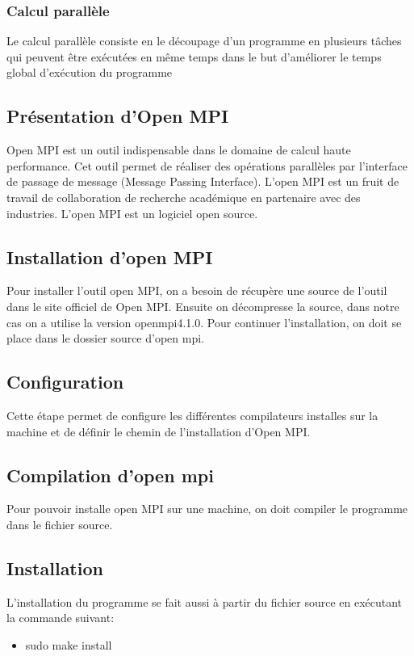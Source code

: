 \documentclass[11pt]{article}
\begin{document}
\subsubsection{Calcul parallèle}
\label{sec:org32fbeed}
Le calcul parallèle consiste en le découpage d’un programme en plusieurs tâches qui peuvent être exécutées en même temps dans le but d’améliorer le temps global d’exécution du programme
\subsection{Présentation d'Open MPI}
\label{sec:org5c4e16c}
Open MPI est un outil indispensable dans le domaine de calcul haute performance.
Cet outil permet de réaliser des opérations parallèles par l'interface de passage de message (Message Passing Interface).
L'open MPI est un fruit de travail de collaboration de recherche académique en partenaire avec des industries. L'open MPI est un logiciel open source.
\subsection{Installation d'open MPI}
\label{sec:orgd843bc6}
Pour installer l'outil open MPI, on a besoin de récupère une source de l'outil dans le site officiel de Open MPI. Ensuite on décompresse la source, dans notre cas on a utilise la version openmpi4.1.0.
Pour continuer l'installation, on doit se place dans le dossier source d'open mpi.
\subsection{Configuration}
\label{sec:orgad5bd49}
Cette étape permet de configure les différentes compilateurs installes sur la machine et de définir le chemin de l'installation d'Open MPI.
\subsection{Compilation d'open mpi}
\label{sec:org13bab62}
Pour pouvoir installe open MPI sur une machine, on doit compiler le programme dans le fichier source.
\subsection{Installation}
\label{sec:org7cd6e2d}
L'installation du programme se fait aussi à partir du fichier source en exécutant la commande suivant:
\begin{itemize}
\item sudo make install
\end{itemize}
\end{document}
